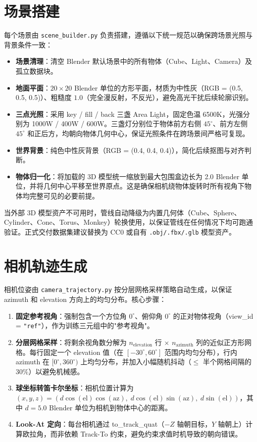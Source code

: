 \section{场景搭建}

每个场景由 \texttt{scene\_builder.py} 负责搭建，遵循以下统一规范以确保跨场景光照与背景条件一致：

\begin{itemize}
    \item \textbf{场景清理}：清空 Blender 默认场景中的所有物体（Cube、Light、Camera）及孤立数据块。
    \item \textbf{地面平面}：$20 \times 20$ Blender 单位的方形平面，材质为中性灰（RGB = (0.5, 0.5, 0.5)）、粗糙度 $1.0$（完全漫反射，不反光），避免高光干扰后续轮廓识别。
    \item \textbf{三点光照}：采用 key / fill / back 三盏 Area Light，固定色温 6500K，光强分别为 1000W / 400W / 600W。三盏灯分别位于物体前方右侧 $45^\circ$、前方左侧 $45^\circ$ 和正后方，均朝向物体几何中心，保证光照条件在跨场景间严格可复现。
    \item \textbf{世界背景}：纯色中性灰背景（RGB = (0.4, 0.4, 0.4)），简化后续抠图与对齐判断。
    \item \textbf{物体归一化}：将加载的 3D 模型统一缩放到最大包围盒边长为 2.0 Blender 单位，并将几何中心平移至世界原点。这是确保相机绕物体旋转时所有视角下物体均完整可见的必要前提。
\end{itemize}

当外部 3D 模型资产不可用时，管线自动降级为内置几何体（Cube、Sphere、Cylinder、Cone、Torus、Monkey）轮换使用，以保证管线在任何情况下均可跑通验证。正式交付数据集建议替换为 CC0 或自有 \texttt{.obj/.fbx/.glb} 模型资产。

\section{相机轨迹生成}

相机位姿由 \texttt{camera\_trajectory.py} 按分层网格采样策略自动生成，以保证 azimuth 和 elevation 方向上的均匀分布。核心步骤：

\begin{enumerate}[label=(\arabic*)]
    \item \textbf{固定参考视角}：强制包含一个方位角 $0^\circ$、俯仰角 $0^\circ$ 的正对物体视角（view\_id = \texttt{"ref"}），作为训练三元组中的"参考视角"。
    \item \textbf{分层网格采样}：将剩余视角数分解为 $n_{\text{elevation}}$ 行 $\times$ $n_{\text{azimuth}}$ 列的近似正方形网格。每行固定一个 elevation 值（在 $[-30^\circ, 60^\circ]$ 范围内均匀分布），行内 azimuth 在 $[0^\circ, 360^\circ)$ 上均匀分布，并加入小幅随机抖动（$\leq$ 半个网格间隔的 $30\%$）以避免机械感。
    \item \textbf{球坐标转笛卡尔坐标}：相机位置计算为 $ (x, y, z) = (d \cos(\text{el}) \cos(\text{az}),\; d \cos(\text{el}) \sin(\text{az}),\; d \sin(\text{el}))$，其中 $d = 5.0$ Blender 单位为相机到物体中心的距离。
    \item \textbf{Look-At 定向}：每台相机通过 to\_track\_quat（$-Z$ 轴朝目标，$Y$ 轴朝上）计算欧拉角，而非依赖 Track-To 约束，避免约束求值时机导致的朝向错误。
\end{enumerate}

